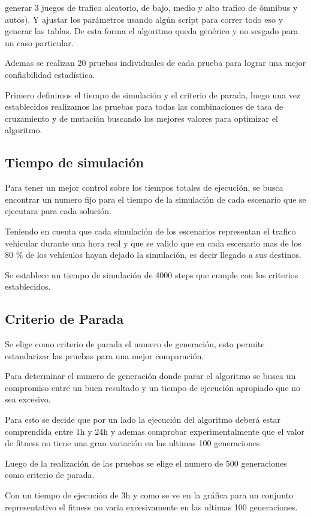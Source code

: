 generar 3 juegos de trafico aleatorio, de bajo, medio y alto trafico de ómnibus y autos). Y ajustar los parámetros usando algún script para correr todo eso y generar las tablas. De esta forma el algoritmo queda genérico y no sesgado para un caso particular.

Ademas se realizan 20 pruebas individuales de cada prueba para lograr una mejor confiabilidad estadística.

Primero definimos el tiempo de simulación y el criterio de parada, luego una vez establecidos realizamos las pruebas para todas las combinaciones de tasa de cruzamiento y de mutación buscando los mejores valores para optimizar el algoritmo.


\subsection{Tiempo de simulación}

Para tener un mejor control sobre los tiempos totales de ejecución, se busca encontrar un numero fijo para el tiempo de la simulación de cada escenario que se ejecutara para cada solución.

Teniendo en cuenta que cada simulación de los escenarios representan el trafico vehicular durante una hora real y que se valido que en cada escenario mas de los 80 \% de los vehículos hayan dejado la simulación, es decir llegado a sus destinos.

Se establece un tiempo de simulación de 4000 steps que cumple con los criterios establecidos. 

\subsection{Criterio de Parada}
Se elige como criterio de parada el numero de generación, esto permite estandarizar las pruebas para una mejor comparación.

Para determinar el numero de generación donde parar el algoritmo se busca un compromiso entre un buen resultado y un tiempo de ejecución apropiado que no sea excesivo.

Para esto se decide que por un lado la ejecución del algoritmo deberá estar comprendida entre 1h y 24h y ademas comprobar experimentalmente que el valor de fitness no tiene una gran variación en las ultimas 100 generaciones.

Luego de la realización de las pruebas se elige el numero de 500 generaciones como criterio de parada.

Con un tiempo de ejecución de 3h y como se ve en la gráfica para un conjunto representativo el fitness no varia excesivamente en las ultimas 100 generaciones.


